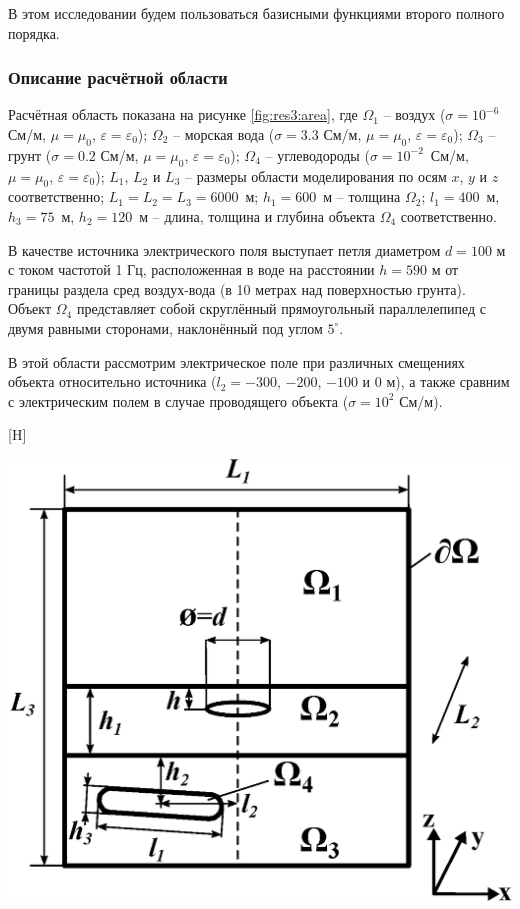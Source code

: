 \documentclass[a4paper,14pt]{article}
\makeatletter
\renewenvironment{figure}[1][\fps@figure]{
  \edef\@tempa{\noexpand\@float{figure}[#1]}
  \@tempa
  \addtocounter{foofigure}{1}
}{
  \end@float
}
\makeatother
\begin{document}
В этом исследовании будем пользоваться базисными функциями второго полного порядка.

\subsubsection{Описание расчётной области}
Расчётная область показана на рисунке \ref{fig:res3:area}, где $\Omega_1$ -- воздух ($\sigma=10^{-6}$ См/м, $\mu=\mu_0$, $\varepsilon=\varepsilon_0$); $\Omega_2$ -- морская вода ($\sigma=3.3$ См/м, $\mu=\mu_0$, $\varepsilon=\varepsilon_0$); $\Omega_3$ -- грунт ($\sigma=0.2$ См/м, $\mu=\mu_0$, $\varepsilon=\varepsilon_0$); $\Omega_4$ -- углеводороды ($\sigma=10^{-2}$~См/м, $\mu=\mu_0$, $\varepsilon=\varepsilon_0$); $L_1$, $L_2$ и $L_3$ -- размеры области моделирования по осям $x$, $y$ и $z$ соответственно; $L_1 = L_2 = L_3 = 6000$~м; $h_1=600$~м -- толщина $\Omega_2$; $l_1=400$~м, $h_3=75$~м, $h_2=120$~м -- длина, толщина и глубина объекта $\Omega_4$ соответственно.

В качестве источника электрического поля выступает петля диаметром $d=100$ м с током частотой 1 Гц, расположенная в воде на расстоянии $h=590$ м от границы раздела сред воздух-вода (в 10 метрах над поверхностью грунта). Объект $\Omega_4$
представляет собой скруглённый прямоугольный параллелепипед с двумя равными сторонами, наклонённый под углом $5^{\circ}$.

В этой области рассмотрим электрическое поле при различных смещениях объекта относительно источника ($l_2=-300$, $-200$, $-100$ и $0$ м), а также сравним с электрическим полем в случае проводящего объекта ($\sigma=10^2$ См/м).

\begin{figure}[H]
	\centering
	\includegraphics[scale=0.7]{research-3/area/area_3layers_shift_3.eps}
	\caption{расчётная область}
	\label{fig:res3:area}
\end{figure}
\end{document}
